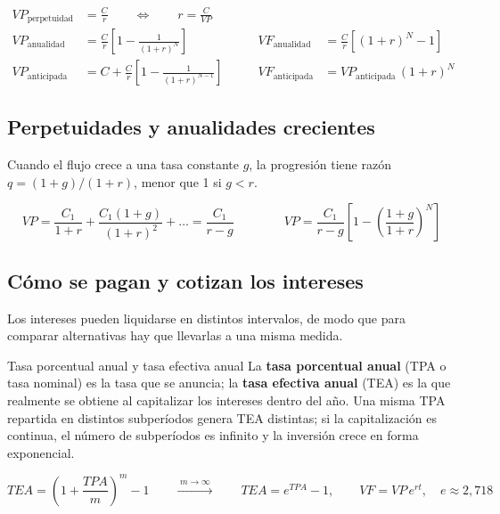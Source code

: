 \begin{formulaBox}
\[
\begin{aligned}
VP_{\text{perpetuidad}} &= \frac{C}{r} \qquad\Longleftrightarrow\qquad r = \frac{C}{VP} \\[3pt]
VP_{\text{anualidad}} &= \frac{C}{r}\left[1-\frac{1}{(1+r)^{N}}\right]
&\qquad
VF_{\text{anualidad}} &= \frac{C}{r}\left[(1+r)^{N}-1\right] \\[3pt]
VP_{\text{anticipada}} &= C + \frac{C}{r}\left[1-\frac{1}{(1+r)^{N-1}}\right]
&\qquad
VF_{\text{anticipada}} &= VP_{\text{anticipada}}\,(1+r)^{N}
\end{aligned}
\]
\end{formulaBox}

\subsection{Perpetuidades y anualidades crecientes}

Cuando el flujo crece a una tasa constante $g$, la progresión tiene razón $q = (1+g)/(1+r)$, menor que 1 si $g<r$.

\begin{formulaBox}
\[
VP = \frac{C_1}{1+r}+\frac{C_1(1+g)}{(1+r)^2}+\dots = \frac{C_1}{r-g}
\qquad\qquad
VP = \frac{C_1}{r-g}\left[1-\left(\frac{1+g}{1+r}\right)^{N}\right]
\]
\end{formulaBox}

\subsection{Cómo se pagan y cotizan los intereses}

Los intereses pueden liquidarse en distintos intervalos, de modo que para comparar alternativas hay que llevarlas a una misma medida.

\begin{definicion}{Tasa porcentual anual y tasa efectiva anual}
La \textbf{tasa porcentual anual} (TPA o tasa nominal) es la tasa que se anuncia; la \textbf{tasa efectiva anual} (TEA) es la que realmente se obtiene al capitalizar los intereses dentro del año. Una misma TPA repartida en distintos subperíodos genera TEA distintas; si la capitalización es continua, el número de subperíodos es infinito y la inversión crece en forma exponencial.
\end{definicion}

\begin{formulaBox}
\[
TEA = \left(1+\frac{TPA}{m}\right)^{m}-1
\qquad
\xrightarrow{\;m\to\infty\;}
\qquad
TEA = e^{TPA}-1,
\qquad
VF = VP\,e^{r t},\quad e \approx 2{,}718
\]
\end{formulaBox}


